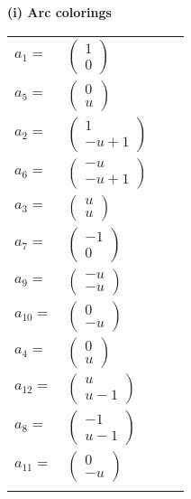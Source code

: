 \documentclass[1p]{elsarticle_modified}
\theoremstyle{definition}
\begin{document}
\flushleft \textbf{(i) Arc colorings}\\
\begin{tabular}{m{7pt} m{180pt} m{7pt} m{180pt} }
\flushright $a_{1}=$&$\begin{pmatrix}1\\0\end{pmatrix}$ \\
\flushright $a_{5}=$&$\begin{pmatrix}0\\u\end{pmatrix}$ \\
\flushright $a_{2}=$&$\begin{pmatrix}1\\- u+1\end{pmatrix}$ \\
\flushright $a_{6}=$&$\begin{pmatrix}- u\\- u+1\end{pmatrix}$ \\
\flushright $a_{3}=$&$\begin{pmatrix}u\\u\end{pmatrix}$ \\
\flushright $a_{7}=$&$\begin{pmatrix}-1\\0\end{pmatrix}$ \\
\flushright $a_{9}=$&$\begin{pmatrix}- u\\- u\end{pmatrix}$ \\
\flushright $a_{10}=$&$\begin{pmatrix}0\\- u\end{pmatrix}$ \\
\flushright $a_{4}=$&$\begin{pmatrix}0\\u\end{pmatrix}$ \\
\flushright $a_{12}=$&$\begin{pmatrix}u\\u-1\end{pmatrix}$ \\
\flushright $a_{8}=$&$\begin{pmatrix}-1\\u-1\end{pmatrix}$ \\
\flushright $a_{11}=$&$\begin{pmatrix}0\\- u\end{pmatrix}$\\&\end{tabular}
\end{document}

